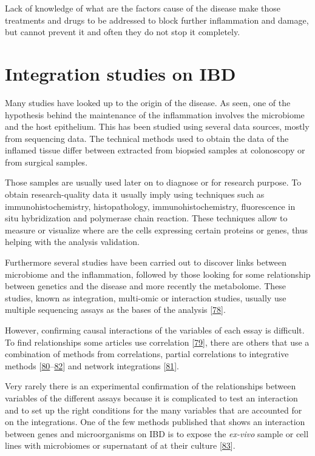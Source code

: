 \documentclass[
  a4paper,
]{book}
\begin{document}
Lack of knowledge of what are the factors cause of the disease make those treatments and drugs to be addressed to block further inflammation and damage, but cannot prevent it and often they do not stop it completely.

\hypertarget{integration-studies-on-ibd}{%
\section{Integration studies on IBD}\label{integration-studies-on-ibd}}

Many studies have looked up to the origin of the disease.
As seen, one of the hypothesis behind the maintenance of the inflammation involves the microbiome and the host epithelium.
This has been studied using several data sources, mostly from sequencing data.
The technical methods used to obtain the data of the inflamed tissue differ between extracted from biopsied samples at colonoscopy or from surgical samples.

Those samples are usually used later on to diagnose or for research purpose.
To obtain research-quality data it usually imply using techniques such as immunohistochemistry, histopathology, immunohistochemistry, fluorescence in situ hybridization and polymerase chain reaction.
These techniques allow to measure or visualize where are the cells expressing certain proteins or genes, thus helping with the analysis validation.

Furthermore several studies have been carried out to discover links between microbiome and the inflammation, followed by those looking for some relationship between genetics and the disease and more recently the metabolome.
These studies, known as integration, multi-omic or interaction studies, usually use multiple sequencing assays as the bases of the analysis {[}\protect\hyperlink{ref-beck2021}{78}{]}.

However, confirming causal interactions of the variables of each essay is difficult.
To find relationships some articles use correlation {[}\protect\hyperlink{ref-hasler_uncoupling_2016}{79}{]}, there are others that use a combination of methods from correlations, partial correlations to integrative methods {[}\protect\hyperlink{ref-tang2017}{80}--\protect\hyperlink{ref-huWholeExomeSequencing2021}{82}{]} and network integrations {[}\protect\hyperlink{ref-hernuxe1ndez-rocha2021}{81}{]}.

Very rarely there is an experimental confirmation of the relationships between variables of the different assays because it is complicated to test an interaction and to set up the right conditions for the many variables that are accounted for on the integrations.
One of the few methods published that shows an interaction between genes and microorganisms on IBD is to expose the \emph{ex-vivo} sample or cell lines with microbiomes or supernatant of at their culture {[}\protect\hyperlink{ref-mayorgas2021}{83}{]}.
\end{document}
